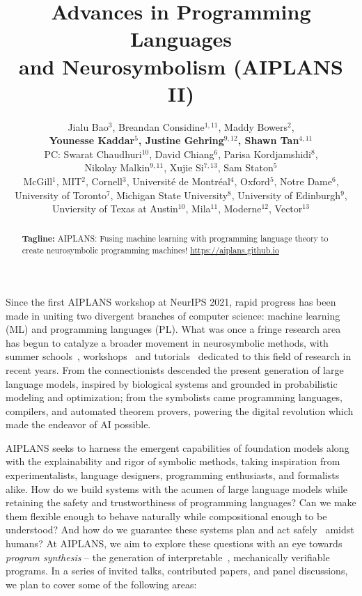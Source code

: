 \documentclass{article}
\title{Advances in Programming Languages\\ and Neurosymbolism (AIPLANS II)}
\author{%
  Jialu Bao$^3$, Breandan Considine$^{1, 11}$, Maddy Bowers$^2$, \\\textbf{Younesse Kaddar$^{5}$, Justine Gehring$^{9, 12}$, Shawn Tan$^{4, 11}$} \\
  PC: Swarat Chaudhuri$^{10}$, David Chiang$^6$, Parisa Kordjamshidi$^8$,\\\vspace{0.1cm}Nikolay Malkin$^{9,11}$, Xujie Si$^{7, 13}$, Sam Staton$^{5}$\\
  \footnotesize{McGill$^1$, MIT$^2$, Cornell$^3$, Universit\'e de Montr\'eal$^4$, Oxford$^{5}$, Notre Dame$^6$,}\\\footnotesize{University of Toronto$^7$, Michigan State University$^8$, University of Edinburgh$^9$,}\\\footnotesize{Unviersity of Texas at Austin$^{10}$, Mila$^{11}$, Moderne$^{12}$, Vector$^{13}$}
}
\begin{document}
\maketitle
\vspace{-0.5cm}
\begin{abstract}
  \textbf{Tagline:} AIPLANS: Fusing machine learning with programming language theory to create neurosymbolic programming machines! \url{https://aiplans.github.io} %
\end{abstract}

Since the first AIPLANS workshop at NeurIPS 2021, rapid progress has been made in uniting two divergent branches of computer science: machine learning (ML) and programming languages (PL). What was once a fringe research area has begun to catalyze a broader movement in neurosymbolic methods, with summer schools~\cite{munawar2023neurosymbolic, costilla2024neurosymbolic}, workshops~\cite{thanapalasingam2023nesysgems, belle2023neurosys, munawar2024neurosymbolic, llievski2024neurosymbolic} and tutorials~\cite{palangi2022tutorial, chaudhuri2023poplneurosym, shakarian2024tutorial} dedicated to this field of research in recent years. From the connectionists descended the present generation of large language models, inspired by biological systems and grounded in probabilistic modeling and optimization; from the symbolists came programming languages, compilers, and automated theorem provers, powering the digital revolution which made the endeavor of AI possible.


AIPLANS seeks to harness the emergent capabilities of foundation models along with the explainability and rigor of symbolic methods, taking inspiration from experimentalists, language designers, programming enthusiasts, and formalists alike. How do we build systems with the acumen of large language models while retaining the safety and trustworthiness of programming languages? Can we make them flexible enough to behave naturally while compositional enough to be understood? And how do we guarantee these systems plan and act safely~\cite{hill2021actions} amidst humans? At AIPLANS, we aim to explore these questions with an eye towards \textit{program synthesis} -- the generation of interpretable~\cite{ellis2023dreamcoder}, mechanically verifiable programs. In a series of invited talks, contributed papers, and panel discussions, we plan to cover some of the following areas:
\end{document}
